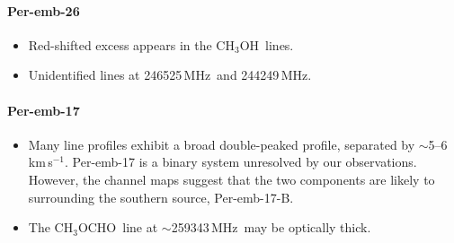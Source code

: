 \documentclass[twocolumn]{aastex62}
\newcommand{\kms}{\mbox{\,km\,s$^{-1}$}}
\newcommand{\mhz}{\mbox{\,MHz}}
\newcommand{\htcn}{\mbox{H$^{13}$CN}}
\newcommand{\methylformate}{\mbox{CH$_{3}$OCHO}}
\newcommand{\methanol}{\mbox{CH$_{3}$OH}}
\newcommand{\acetaldehyde}{\mbox{CH$_{3}$CHO}}
\newcommand{\ethylcyanide}{\mbox{CH$_{3}$CH$_{2}$CN}}
\newcommand{\cctht}{\mbox{c-C$_{3}$H$_{2}$}}
\begin{document}
\paragraph{Per-emb-26}
\begin{itemize}
  \item Red-shifted excess appears in the \methanol\ lines.
  \item Unidentified lines at 246525\mhz\ and 244249\mhz.
\end{itemize}



\paragraph{Per-emb-17}
\begin{itemize}
  \item Many line profiles exhibit a broad double-peaked profile, separated by $\sim$5--6\kms.  Per-emb-17 is a binary system unresolved by our observations.  However, the channel maps suggest that the two components are likely to surrounding the southern source, Per-emb-17-B.
  \item The \methylformate\ line at $\sim$259343\mhz\ may be optically thick.
\end{itemize}
\end{document}
